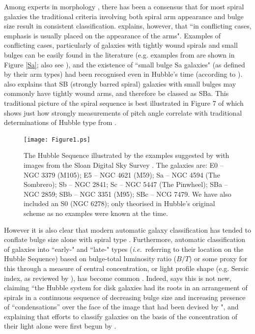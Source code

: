 \documentclass[usenatbib]{mn2e}
\newcommand{\ie}{{\it i.e.}}
\begin{document}
Among experts in morphology \citep[e.g.][]{Sandage2005,Buta2013}, there has been a consensus that for most spiral galaxies the traditional criteria involving both spiral arm appearance and bulge size result in consistent classification. \citet{Buta2013} explains, however, that ``in conflicting cases, emphasis is usually placed on the appearance of the arms". Examples of conflicting cases, particularly of galaxies with tightly wound spirals and small bulges can be easily  found in the literature (e.g. examples from \citealt{Hogg1993} are shown in Figure \ref{Sa}; also see \citealt{Sandage1961, SandageBedke1994, Jore1996}), and the existence of ``small bulge Sa galaxies" (as defined by their arm types) had been recognised even in Hubble's time (according to \citealt{Sandage2005}). \citet{Buta2013} also explains that SB (strongly barred spiral) galaxies with small bulges may commonly have tightly wound arms, and therefore be classed as SBa. This traditional picture of the spiral sequence is best illustrated in Figure 7 of \citet{kennicutt1981} which shows just how strongly measurements of pitch angle correlate with traditional determinations of Hubble type from \citet{sandagetammann1981}. 

\begin{landscape}
\begin{figure}
\texttt{[image: Figure1.ps]}
\caption{The Hubble Sequence illustrated by the examples suggested by \citet{Hubble1926} with images from the Sloan Digital Sky Survey \citep[SDSS; ][]{York2000}. The galaxies are: E0 -- NGC 3379 (M105); E5 -- NGC 4621 (M59);  Sa -- NGC 4594 (The Sombrero);  Sb -- NGC 2841; Sc -- NGC 5447 (The Pinwheel); SBa -- NGC 2859; SBb -- NGC 3351 (M95); SBc -- NCG 7479. We have also included an S0 (NGC 6278); only theorised in Hubble's original scheme as no examples were known at the time. \label{sequence}}
\end{figure}
\end{landscape}

However it is also clear that modern automatic galaxy classification has tended to conflate bulge size alone with spiral type \citep[e.g.][]{Goto2003, Laurikainen2007, gadotti2009, Masters2010, Lange2016}. Furthermore, automatic classification of galaxies into ``early-" and ``late-" types (\ie ~referring to their location on the Hubble Sequence) based on bulge-total luminosity ratio ($B/T$) or some proxy for this through a measure of central concentration, or light profile shape (e.g. Sersic index, as reviewed by \citealt{2005PASA...22..118G}), has become common \citep[e.g.][]{vanderWel2011}. Indeed, \citet{Sandage2005} says this is not new, claiming ``the Hubble system for disk galaxies had its roots in an arrangement of spirals in a continuous sequence of decreasing bulge size and increasing presence of ``condensations'' over the face of the image that had been devised by \citet{Reynolds1920}", and explaining that efforts to classify galaxies on the basis of the concentration of their light alone were first begun by \citet{Shapley1927}. 
\end{document}
